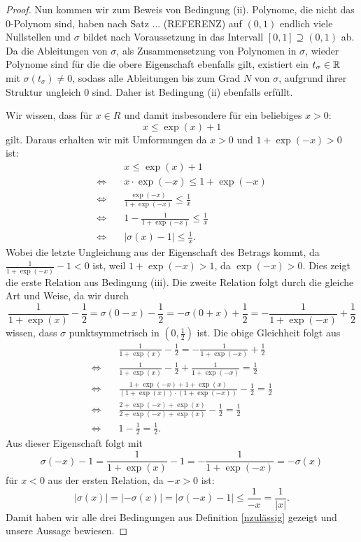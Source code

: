 \begin{proof}
Nun kommen wir zum Beweis von Bedingung (ii). Polynome, die nicht das $0$-Polynom sind, haben nach Satz ... (REFERENZ) auf $(0, 1)$ endlich viele Nullstellen und $\sigma$ bildet nach Voraussetzung in das Intervall $[0, 1] \supseteq (0, 1)$ ab. Da die Ableitungen von $\sigma$, als Zusammensetzung von Polynomen in $\sigma$, wieder Polynome sind für die die obere Eigenschaft ebenfalls gilt, existiert ein $t_{\sigma} \in \mathbb{R}$ mit $\sigma(t_{\sigma}) \neq 0$, sodass alle Ableitungen bis zum Grad $N$ von $\sigma$, aufgrund ihrer Struktur ungleich $0$ sind. Daher ist Bedingung (ii) ebenfalls erfüllt.

Wir wissen, dass für $x \in R$ und damit insbesondere für ein beliebiges $x > 0$: $$ x \leq \exp(x) + 1$$ gilt. Daraus erhalten wir mit Umformungen da $x > 0$ und $1 + \exp(-x) > 0$ ist:
\begin{equation*}
\begin{split}
& \quad x \leq \exp(x) + 1 \\
 \Leftrightarrow & \quad x \cdot \exp(-x) \leq 1 + \exp(-x) \\
 \Leftrightarrow & \quad \frac{\exp(-x)}{1 + \exp(-x)} \leq \frac{1}{x} \\
 \Leftrightarrow & \quad 1 - \frac{1}{1 + \exp(-x)} \leq \frac{1}{x} \\
 \Leftrightarrow & \quad |\sigma(x) - 1| \leq \frac{1}{x}.
\end{split}
\end{equation*}
Wobei die letzte Ungleichung aus der Eigenschaft des Betrags kommt, da $\frac{1}{1 + \exp(-x)} - 1< 0$ ist, weil $1 + \exp(-x) > 1$, da $\exp(-x) > 0$. Dies zeigt die erste Relation aus Bedingung (iii).
Die zweite Relation folgt durch die gleiche Art und Weise, da wir durch $$\frac{1}{1 + \exp(x)} - \frac{1}{2}= \sigma(0 - x) - \frac{1}{2} = -\sigma(0 + x) + \frac{1}{2} = -\frac{1}{1 + \exp(-x)} + \frac{1}{2}$$ 
wissen, dass $\sigma$ punktsymmetrisch in $(0, \frac{1}{2})$ ist. Die obige Gleichheit folgt aus
\begin{equation*}
\begin{split}
 & \quad \frac{1}{1 + \exp(x)} - \frac{1}{2} = -\frac{1}{1 + \exp(-x)} + \frac{1}{2} \\
 \Leftrightarrow  & \quad \frac{1}{1 + \exp(x)} - \frac{1}{2} +\frac{1}{1 + \exp(-x)} = \frac{1}{2}\\
 \Leftrightarrow & \quad  \frac{1 + \exp(-x) + 1 + \exp(x)}{(1 + \exp(x)) \cdot (1 + \exp(-x))} - \frac{1}{2} = \frac{1}{2} \\
 \Leftrightarrow & \quad \frac{2 + \exp(-x) + \exp(x)}{2 + \exp(-x) + \exp(x)} - \frac{1}{2} = \frac{1}{2} \\
 \Leftrightarrow & \quad 1 - \frac{1}{2} = \frac{1}{2}.
\end{split}
\end{equation*}
Aus dieser Eigenschaft folgt mit $$\sigma(- x) - 1 = \frac{1}{1 + \exp(x)} - 1 = -\frac{1}{1 + \exp(-x)} = -\sigma(x)$$ für $x < 0$ aus der ersten Relation, da $-x > 0 $ ist$\colon$  
$$|\sigma(x)| = |-\sigma(x)| = |\sigma(- x) - 1| \leq \frac{1}{-x} = \frac{1}{|x|}.$$
Damit haben wir alle drei Bedingungen aus Definition \ref{nzulässig} gezeigt und unsere Aussage bewiesen.
\end{proof}
